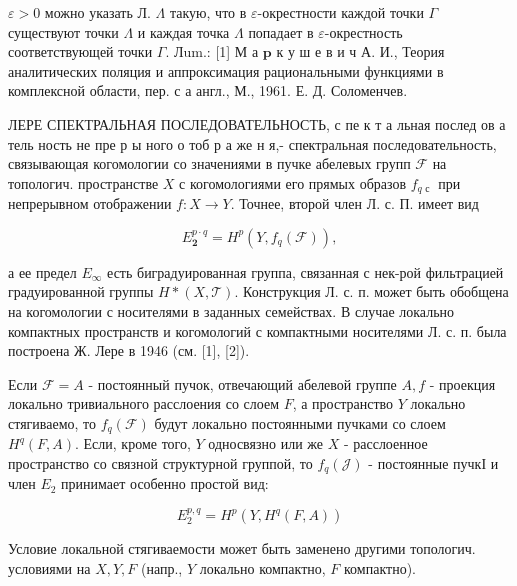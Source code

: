 \documentclass[10pt]{article}
\begin{document}
$\varepsilon>0$ можно указать Л. $\Lambda$ такую, что в $\varepsilon$-окрестности каждой точки $\Gamma$ существуют точки $\Lambda$ и каждая точка $\Lambda$ попадает в $\varepsilon$-окрестность соответствующей точки $\Gamma$. Лum.: [1] М а $\mathbf{p}$ к у ш е в и ч А. И., Теория аналитических поляция и аппроксимация рациональными функциями в комплексной области, пер. с а англ., М., 1961. Е. Д. Соломенчев.



ЛЕРЕ СПЕКТРАЛЬНАЯ ПОСЛЕДОВАТЕЛЬНОСТЬ, с пе к т а льная послед ов а тель ность не пре р ы ного о тоб р а же н я,- спектральная последовательность, связывающая когомологии со значениями в пучке абелевых групп $\mathcal{F}$ на топологич. пространстве $X$ с когомологиями его прямых образов $f_{q \text { с }}$ при непрерывном отображении $f: X \rightarrow Y$. Точнее, второй член Л. с. П. имеет вид



\[

E_{\mathbf{2}}^{p \cdot q}=H^{p}\left(Y, f_{q}(\mathscr{F})\right),

\]



а ее предел $E_{\infty}$ есть биградуированная группа, связанная с нек-рой фильтрацией градуированной группы $H *(X, \mathcal{T})$. Конструкция Л. с. п. может быть обобщена на когомологии с носителями в заданных семействах. В случае локально компактных пространств и когомологий с компактными носителями Л. с. п. была построена Ж. Лере в 1946 (см. [1], [2]).



Если $\mathscr{F}=A$ - постоянный пучок, отвечающий абелевой группе $A, f$ - проекция локально тривиального расслоения со слоем $F$, а пространство $Y$ локально стягиваемо, то $f_{q}(\mathscr{F})$ будут локально постоянными пучками со слоем $H^{q}(F, A)$. Если, кроме того, $Y$ односвязно или же $X$ - расслоенное пространство со связной структурной группой, то $f_{q}(\mathscr{J})$ - постоянные пучкІ и член $E_{2}$ принимает особенно простой вид:



\[

E_{2}^{p, q}=H^{p}\left(Y, H^{q}(F, A)\right)

\]



Условие локальной стягиваемости может быть заменено другими топологич. условиями на $X, Y, F$ (напр., $Y$ локально компактно, $F$ компактно).
\end{document}

